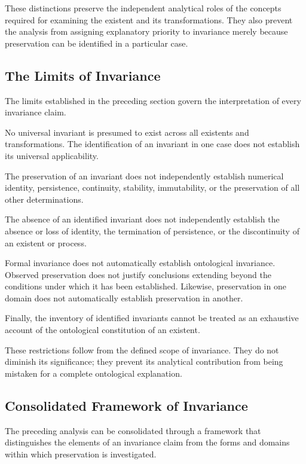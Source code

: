 These distinctions preserve the independent analytical
roles of the concepts required for examining the
existent and its transformations. They also prevent
the analysis from assigning explanatory priority
to invariance merely because preservation can be
identified in a particular case.

\subsection{The Limits of Invariance}

The limits established in the preceding section
govern the interpretation of every invariance claim.

No universal invariant is presumed to exist across
all existents and transformations. The identification
of an invariant in one case does not establish its
universal applicability.

The preservation of an invariant does not
independently establish numerical identity,
persistence, continuity, stability, immutability,
or the preservation of all other determinations.

The absence of an identified invariant does not
independently establish the absence or loss of
identity, the termination of persistence, or the
discontinuity of an existent or process.

Formal invariance does not automatically establish
ontological invariance. Observed preservation does
not justify conclusions extending beyond the
conditions under which it has been established.
Likewise, preservation in one domain does not
automatically establish preservation in another.

Finally, the inventory of identified invariants
cannot be treated as an exhaustive account of the
ontological constitution of an existent.

These restrictions follow from the defined scope
of invariance. They do not diminish its significance;
they prevent its analytical contribution from being
mistaken for a complete ontological explanation.

\subsection{Consolidated Framework of Invariance}

The preceding analysis can be consolidated through
a framework that distinguishes the elements of
an invariance claim from the forms and domains
within which preservation is investigated.

